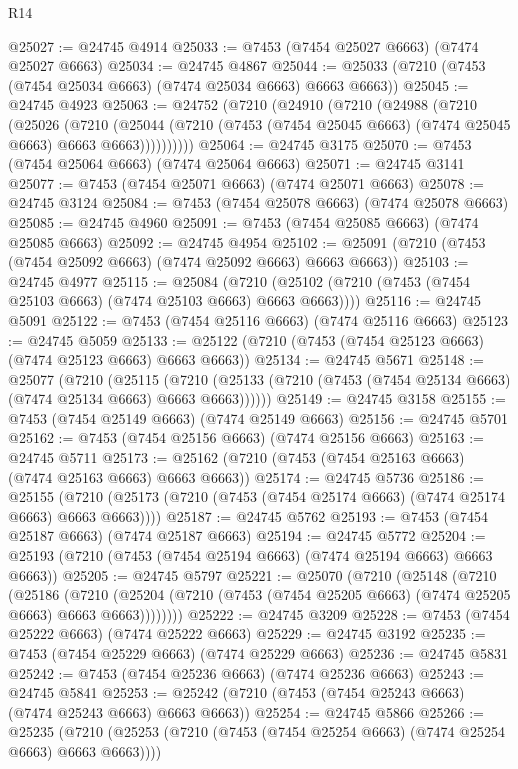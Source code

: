 \begin{lexlean}{R14}
\begin{coremodule}
@25027 := @24745 @4914
@25033 := @7453 (@7454 @25027 @6663) (@7474 @25027 @6663)
@25034 := @24745 @4867
@25044 := @25033 (@7210 (@7453 (@7454 @25034 @6663) (@7474 @25034 @6663) @6663 @6663))
@25045 := @24745 @4923
@25063 := @24752
    (@7210
      (@24910
        (@7210
          (@24988
            (@7210
              (@25026
                (@7210
                  (@25044
                    (@7210 (@7453 (@7454 @25045 @6663) (@7474 @25045 @6663) @6663 @6663))))))))))
@25064 := @24745 @3175
@25070 := @7453 (@7454 @25064 @6663) (@7474 @25064 @6663)
@25071 := @24745 @3141
@25077 := @7453 (@7454 @25071 @6663) (@7474 @25071 @6663)
@25078 := @24745 @3124
@25084 := @7453 (@7454 @25078 @6663) (@7474 @25078 @6663)
@25085 := @24745 @4960
@25091 := @7453 (@7454 @25085 @6663) (@7474 @25085 @6663)
@25092 := @24745 @4954
@25102 := @25091 (@7210 (@7453 (@7454 @25092 @6663) (@7474 @25092 @6663) @6663 @6663))
@25103 := @24745 @4977
@25115 := @25084
    (@7210 (@25102 (@7210 (@7453 (@7454 @25103 @6663) (@7474 @25103 @6663) @6663 @6663))))
@25116 := @24745 @5091
@25122 := @7453 (@7454 @25116 @6663) (@7474 @25116 @6663)
@25123 := @24745 @5059
@25133 := @25122 (@7210 (@7453 (@7454 @25123 @6663) (@7474 @25123 @6663) @6663 @6663))
@25134 := @24745 @5671
@25148 := @25077
    (@7210
      (@25115
        (@7210 (@25133 (@7210 (@7453 (@7454 @25134 @6663) (@7474 @25134 @6663) @6663 @6663))))))
@25149 := @24745 @3158
@25155 := @7453 (@7454 @25149 @6663) (@7474 @25149 @6663)
@25156 := @24745 @5701
@25162 := @7453 (@7454 @25156 @6663) (@7474 @25156 @6663)
@25163 := @24745 @5711
@25173 := @25162 (@7210 (@7453 (@7454 @25163 @6663) (@7474 @25163 @6663) @6663 @6663))
@25174 := @24745 @5736
@25186 := @25155
    (@7210 (@25173 (@7210 (@7453 (@7454 @25174 @6663) (@7474 @25174 @6663) @6663 @6663))))
@25187 := @24745 @5762
@25193 := @7453 (@7454 @25187 @6663) (@7474 @25187 @6663)
@25194 := @24745 @5772
@25204 := @25193 (@7210 (@7453 (@7454 @25194 @6663) (@7474 @25194 @6663) @6663 @6663))
@25205 := @24745 @5797
@25221 := @25070
    (@7210
      (@25148
        (@7210
          (@25186
            (@7210
              (@25204 (@7210 (@7453 (@7454 @25205 @6663) (@7474 @25205 @6663) @6663 @6663))))))))
@25222 := @24745 @3209
@25228 := @7453 (@7454 @25222 @6663) (@7474 @25222 @6663)
@25229 := @24745 @3192
@25235 := @7453 (@7454 @25229 @6663) (@7474 @25229 @6663)
@25236 := @24745 @5831
@25242 := @7453 (@7454 @25236 @6663) (@7474 @25236 @6663)
@25243 := @24745 @5841
@25253 := @25242 (@7210 (@7453 (@7454 @25243 @6663) (@7474 @25243 @6663) @6663 @6663))
@25254 := @24745 @5866
@25266 := @25235
    (@7210 (@25253 (@7210 (@7453 (@7454 @25254 @6663) (@7474 @25254 @6663) @6663 @6663))))

\end{coremodule}
\end{lexlean}

